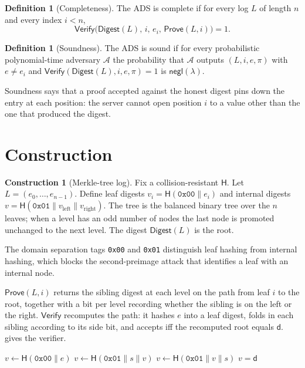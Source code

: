 \documentclass[11pt]{article}
\theoremstyle{plain}
\theoremstyle{definition}
\newtheorem{definition}[theorem]{Definition}
\newtheorem{construction}[theorem]{Construction}
\theoremstyle{remark}
\newcommand{\hash}{\mathsf{H}}
\newcommand{\digest}{\mathsf{d}}
\newcommand{\secpar}{\lambda}
\newcommand{\adv}{\mathcal{A}}
\newcommand{\negl}{\mathsf{negl}}
\begin{document}
\begin{definition}[Completeness]
\label{def:completeness}
The ADS is complete if for every log $L$ of length $n$ and every index
$i < n$,
\[
  \mathsf{Verify}\bigl(\mathsf{Digest}(L),\, i,\, e_i,\,
  \mathsf{Prove}(L, i)\bigr) = 1 .
\]
\end{definition}

\begin{definition}[Soundness]
\label{def:soundness}
The ADS is sound if for every probabilistic polynomial-time adversary
$\adv$ the probability that $\adv$ outputs $(L, i, e, \pi)$ with
$e \neq e_i$ and
$\mathsf{Verify}(\mathsf{Digest}(L), i, e, \pi) = 1$ is
$\negl(\secpar)$.
\end{definition}

Soundness says that a proof accepted against the honest digest pins down
the entry at each position: the server cannot open position $i$ to a
value other than the one that produced the digest.

\section{Construction}
\label{sec:construction}

\begin{construction}[Merkle-tree log]
\label{con:merkle}
Fix a collision-resistant $\hash$. Let $L = (e_0, \dots, e_{n-1})$.
Define leaf digests $v_i = \hash(\texttt{0x00} \mathbin{\|} e_i)$ and
internal digests $v = \hash(\texttt{0x01} \mathbin{\|} v_{\mathrm{left}}
\mathbin{\|} v_{\mathrm{right}})$. The tree is the balanced binary tree
over the $n$ leaves; when a level has an odd number of nodes the last
node is promoted unchanged to the next level. The digest
$\mathsf{Digest}(L)$ is the root.
\end{construction}

The domain separation tags \texttt{0x00} and \texttt{0x01} distinguish
leaf hashing from internal hashing, which blocks the second-preimage
attack that identifies a leaf with an internal node.

$\mathsf{Prove}(L, i)$ returns the sibling digest at each level on the
path from leaf $i$ to the root, together with a bit per level recording
whether the sibling is on the left or the right. $\mathsf{Verify}$
recomputes the path: it hashes $e$ into a leaf digest, folds in each
sibling according to its side bit, and accepts iff the recomputed root
equals $\digest$.  gives the verifier.

\begin{algorithm}
\caption{$\mathsf{Verify}(\digest, i, e, \pi)$}
\label{alg:verify}
\begin{algorithmic}[1]
  \State $v \gets \hash(\texttt{0x00} \mathbin{\|} e)$
      \State $v \gets \hash(\texttt{0x01} \mathbin{\|} s \mathbin{\|} v)$
    \Else
      \State $v \gets \hash(\texttt{0x01} \mathbin{\|} v \mathbin{\|} s)$
    \EndIf
  \EndFor
  \State \Return $v = \digest$
\end{algorithmic}
\end{algorithm}
\end{document}
